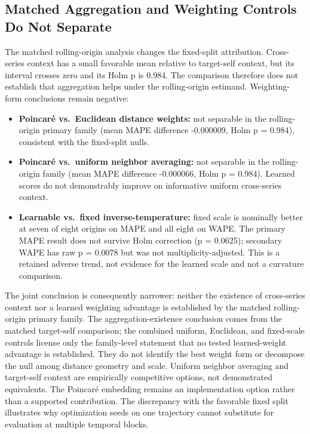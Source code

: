 \documentclass[electronics,article,submit,moreauthors]{Definitions/mdpi}
\providecommand{\tightlist}{\setlength{\itemsep}{0pt}\setlength{\parskip}{0pt}}
\begin{document}
\subsection{Matched Aggregation and Weighting Controls Do Not Separate}\label{matched-aggregation-and-weighting-controls-do-not-separate}

The matched rolling-origin analysis changes the fixed-split attribution. Cross-series context has a small favorable mean relative to target-self context, but its interval crosses zero and its Holm p is 0.984. The comparison therefore does not establish that aggregation helps under the rolling-origin estimand. Weighting-form conclusions remain negative:

\begin{itemize}
\tightlist
\item
  \textbf{Poincar\'{e} vs.~Euclidean distance weights:} not separable in the rolling-origin primary family (mean MAPE difference -0.000009, Holm p = 0.984), consistent with the fixed-split nulls.
\item
  \textbf{Poincar\'{e} vs.~uniform neighbor averaging:} not separable in the rolling-origin family (mean MAPE difference -0.000066, Holm p = 0.984). Learned scores do not demonstrably improve on informative uniform cross-series context.
\item
  \textbf{Learnable vs.~fixed inverse-temperature:} fixed scale is nominally better at seven of eight origins on MAPE and all eight on WAPE. The primary MAPE result does not survive Holm correction (p = 0.0625); secondary WAPE has raw p = 0.0078 but was not multiplicity-adjusted. This is a retained adverse trend, not evidence for the learned scale and not a curvature comparison.
\end{itemize}

The joint conclusion is consequently narrower: neither the existence of cross-series context nor a learned weighting advantage is established by the matched rolling-origin primary family. The aggregation-existence conclusion comes from the matched target-self comparison; the combined uniform, Euclidean, and fixed-scale controls license only the family-level statement that no tested learned-weight advantage is established. They do not identify the best weight form or decompose the null among distance geometry and scale. Uniform neighbor averaging and target-self context are empirically competitive options, not demonstrated equivalents. The Poincar\'{e} embedding remains an implementation option rather than a supported contribution. The discrepancy with the favorable fixed split illustrates why optimization seeds on one trajectory cannot substitute for evaluation at multiple temporal blocks.
\end{document}
